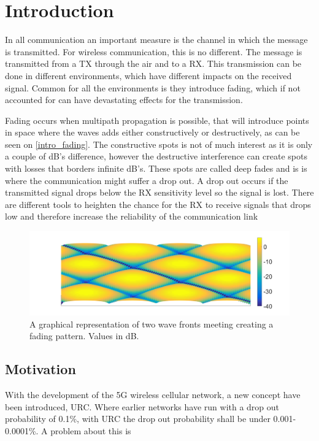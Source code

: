 \chapter{Introduction}

%

In all communication an important measure is the channel in which the message is transmitted. For wireless communication, this is no different. The message is transmitted from a \gls{TX} through the air and to a \gls{RX}. This transmission can be done in different environments, which have different impacts on the received signal. Common for all the environments is they introduce fading, which if not accounted for can have devastating effects for the transmission. 

Fading occurs when multipath propagation is possible, that will introduce points in space where the waves adds either constructively or destructively, as can be seen on \autoref{intro_fading}. The constructive spots is not of much interest as it is only a couple of dB's difference, however the destructive interference can create spots with losses that borders infinite dB's. These spots are called deep fades and is is where the communication might suffer a drop out. A drop out occurs if the transmitted signal drops below the RX sensitivity level so the signal is lost. There are different tools to heighten the chance for the RX to receive signals that drops low and therefore increase the reliability of the communication link


\begin{figure}[H]
\centering
\includegraphics[width=\textwidth]{figures/intro_fading.png}
\caption{A graphical representation of two wave fronts meeting creating a fading pattern. Values in dB.}
\label{intro_fading}
\end{figure}

\section{Motivation}
With the development of the 5G wireless cellular network, a new concept have been introduced, \gls{URC}. Where earlier networks have run with a drop out probability of 0.1\%, with URC the drop out probability shall be under 0.001-0.0001\%. A problem about this is 


